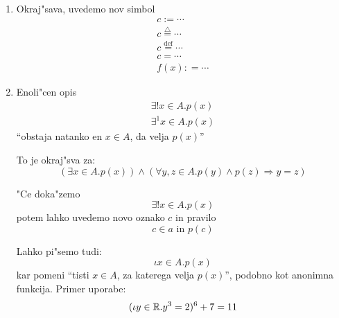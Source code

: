 \begin{enumerate}[1)]
	\item Okraj"sava, uvedemo nov simbol
	\begin{gather*}
		c := \cdots\\
		c \stackrel{\triangle}{=} \cdots\\
		c \stackrel{\text{def}}{=} \cdots\\
		c = \cdots\\
		f(x): = \cdots
	\end{gather*}
	
	\item Enoli"cen opis
	\begin{gather*}
		\exists! x \in A . p(x)\\
		\exists^1 x \in A .p(x)
	\end{gather*}
	``obstaja natanko en $x \in A$, da velja $p(x)$''
	
	To je okraj"sva za:
	\begin{equation*}
	(\exists x \in A .p(x)) \land (\forall y, z \in A . p(y) \land p(z) \Rightarrow y = z)
	\end{equation*}
	
	"Ce doka"zemo
	\begin{equation*}
	\exists! x \in A . p(x)
	\end{equation*}
	potem lahko uvedemo novo oznako $c$ in pravilo
	\begin{equation*}
	c \in a \text{ in } p(c)
	\end{equation*}
	
	Lahko pi"semo tudi:
	\begin{equation*}
	\iota x \in A . p(x)
	\end{equation*}
	kar pomeni ``tisti $x \in A$, za katerega velja $p(x)$'', podobno kot anonimna funkcija. Primer uporabe:
	\begin{equation*}
	(\iota y \in \mathbb{R} . y^3 = 2)^6 + 7 = 11
	\end{equation*}
\end{enumerate}
